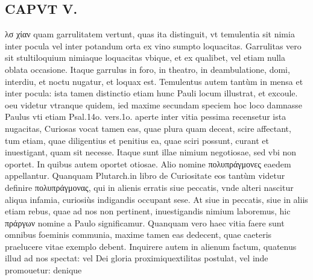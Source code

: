 \documentclass{article}
\begin{document}
\begin{pages}
\section*{CAPVT  V. }
\marginpar{[ p.287 ]}
\marginpar{[ p.O ]}\pstart λσ χίαν quam garrulitatem vertunt, quas ita distinguit, vt temulentia sit nimia inter pocula vel inter potandum orta ex vino sumpto loquacitas. Garrulitas vero sit stultiloquium nimiaque loquacitas vbique, et ex qualibet, vel etiam nulla oblata occasione. Itaque garrulus in foro, in theatro, in deambulatione, domi, interdiu, et noctu nugatur, et loquax est. Temulentus autem tantùm in mensa et inter pocula: ista tamen distinctio etiam hunc Pauli locum illustrat, et excoule. oeu videtur vtranque quidem, ied maxime secundam speciem hoc loco damnasse Paulus vti etiam Psal.14o. vers.1o. aperte inter vitia pessima recensetur ista nugacitas,  \pend\pstart Curiosas vocat tamen eas, quae plura quam deceat, scire affectant, tum etiam, quae diligentius et penitius ea, quae sciri possunt, curant et inuestigant, quam sit necesse. Itaque sunt illae nimium negotiosae, sed vbi non oportet. In quibus autem oportet otiosae. Alio nomine πολυπράγμονες eaedem appellantur. Quanquam Plutarch.in libro de Curiositate eos tantùm videtur definire πολυπράγμονας, qui in alienis erratis siue peccatis, vnde alteri nascitur aliqua infamia, curiosiùs indigandis occupant sese. At siue in peccatis, siue in aliis etiam rebus, quae ad nos non pertinent, inuestigandis nimium laboremus, hic πράργων nomine a Paulo significamur. Quanquam vero haec vitia faere sunt omnibus foeminis communia, maxime tamen eas dedecent, quae caeteris praelucere vitae exemplo debent. Inquirere autem in alienum factum, quatenus illud ad nos spectat: vel Dei gloria proximiquextilitas postulat, vel inde promouetur: denique  \pend

\end{pages}
\end{document}
